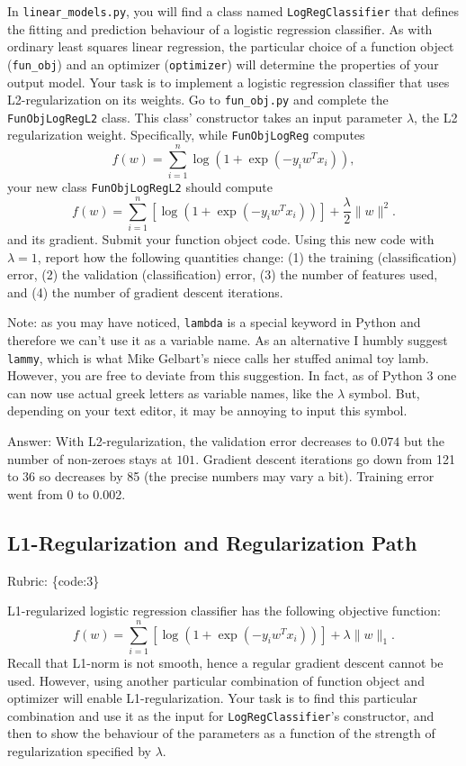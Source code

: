 \documentclass{article}
\def\ans#1{\par\gre{Answer: #1}}
\def\answer#1{\ans{#1}}
\def\rubric#1{\gre{Rubric: \{#1\}}}{}
\def\blu#1{{\color{blu}#1}}
\def\gre#1{{\color{gre}#1}}
\def\norm#1{\|#1\|}
\begin{document}
In \texttt{linear\_models.py}, you will find a class named \texttt{LogRegClassifier} that defines the fitting and prediction behaviour of a logistic regression classifier. As with ordinary least squares linear regression, the particular choice of a function object (\texttt{fun\_obj}) and an optimizer (\texttt{optimizer}) will determine the properties of your output model.
Your task is to implement a logistic regression classifier that uses L2-regularization on its weights. Go to \texttt{fun\_obj.py} and complete the \texttt{FunObjLogRegL2} class. This class' constructor takes an input parameter $\lambda$, the L2 regularization weight. Specifically, while \texttt{FunObjLogReg} computes
\[
f(w) = \sum_{i=1}^n \log(1+\exp(-y_iw^Tx_i)),
\]
your new class \texttt{FunObjLogRegL2} should compute
\[
f(w) = \sum_{i=1}^n \left[\log(1+\exp(-y_iw^Tx_i))\right] + \frac{\lambda}{2}\norm{w}^2.
\]
and its gradient.
\blu{Submit your function object code. Using this new code with $\lambda = 1$, report how the following quantities change: (1) the training (classification) error, (2) the validation (classification) error, (3) the number of features used, and (4) the number of gradient descent iterations.}

Note: as you may have noticed, \texttt{lambda} is a special keyword in Python and therefore we can't use it as a variable name.
As an alternative I humbly suggest \texttt{lammy}, which is what Mike Gelbart's niece calls her stuffed animal toy lamb.
However, you are free to deviate from this suggestion. In fact, as of Python 3 one can now use actual greek letters as variable names, like the $\lambda$ symbol. But, depending on your text editor, it may be annoying to input this symbol.

\answer{
With L2-regularization, the validation error decreases to $0.074$ but the number of non-zeroes stays at $101$. Gradient descent iterations go down from 121 to 36 so decreases by 85 (the precise numbers may vary a bit). Training error went from 0 to 0.002.
}

\subsection{L1-Regularization and Regularization Path}
\rubric{code:3}

L1-regularized logistic regression classifier has the following objective function:
\[
f(w) = \sum_{i=1}^n \left[\log(1+\exp(-y_iw^Tx_i))\right] + \lambda\norm{w}_1.
\]
Recall that L1-norm is not smooth, hence a regular gradient descent cannot be used. However, using another particular combination of function object and 
optimizer will enable L1-regularization. Your task is to find this particular combination and use it as the input for \texttt{LogRegClassifier}'s constructor, and then to show the behaviour of the parameters as a function of the strength of regularization specified by $\lambda$.
\end{document}
